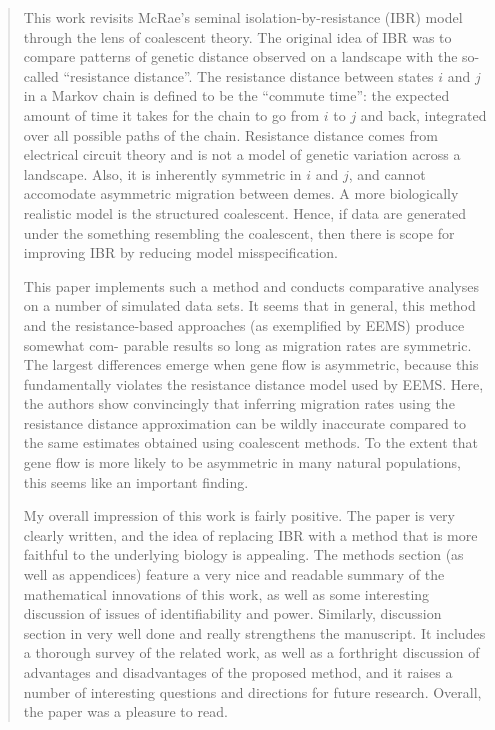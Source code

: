 




\begin{quote}
    This work revisits McRae’s seminal isolation-by-resistance (IBR) model through
    the lens of coalescent theory. The original idea of IBR was to compare patterns of
    genetic distance observed on a landscape with the so-called ``resistance distance''.
    The resistance distance between states $i$ and $j$ in a Markov chain is defined to be
    the ``commute time'': the expected amount of time it takes for the chain to go
    from $i$ to $j$ and back, integrated over all possible paths of the chain. Resistance
    distance comes from electrical circuit theory and is not a model of genetic
    variation across a landscape. Also, it is inherently symmetric in $i$ and $j$, and
    cannot accomodate asymmetric migration between demes. A more biologically
    realistic model is the structured coalescent. Hence, if data are generated under
    the something resembling the coalescent, then there is scope for improving IBR
    by reducing model misspecification.

    This paper implements such a method and conducts comparative analyses on a
    number of simulated data sets. It seems that in general, this method and the
    resistance-based approaches (as exemplified by EEMS) produce somewhat com-
    parable results so long as migration rates are symmetric. The largest differences
    emerge when gene flow is asymmetric, because this fundamentally violates the
    resistance distance model used by EEMS. Here, the authors show convincingly
    that inferring migration rates using the resistance distance approximation can
    be wildly inaccurate compared to the same estimates obtained using coalescent
    methods. To the extent that gene flow is more likely to be asymmetric in many
    natural populations, this seems like an important finding.

    My overall impression of this work is fairly positive. The paper is very clearly
    written, and the idea of replacing IBR with a method that is more faithful to
    the underlying biology is appealing. The methods section (as well as appendices)
    feature a very nice and readable summary of the mathematical innovations of
    this work, as well as some interesting discussion of issues of identifiability and
    power. Similarly, discussion section in very well done and really strengthens
    the manuscript. It includes a thorough survey of the related work, as well as a
    forthright discussion of advantages and disadvantages of the proposed method,
    and it raises a number of interesting questions and directions for future research.
    Overall, the paper was a pleasure to read.
\end{quote}

